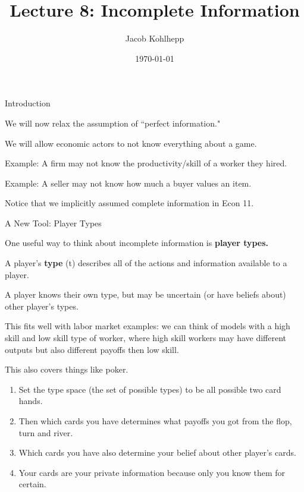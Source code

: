 \documentclass[aspectratio=169]{beamer}
\title[Incomplete]{Lecture 8: Incomplete Information} %
\author{Jacob Kohlhepp} %
\institute[UCLA] %
{
Econ 101 \\ %
\medskip
}
\date{\today} %
\newenvironment{wideitemize}{\itemize\addtolength{\itemsep}{10pt}}{\enditemize}
\begin{document}
\begin{frame}
\titlepage %
\end{frame}

\begin{frame}{Introduction}
\begin{wideitemize}
    \item We will now relax the assumption of ``perfect information."
    \item We will allow economic actors to not know everything about a game.
    \item Example: A firm may not know the productivity/skill of a worker they hired.
    \item Example: A seller may not know how much a buyer values an item.
    \item Notice that we implicitly assumed complete information in Econ 11.

\end{wideitemize}
\end{frame}

\begin{frame}{A New Tool: Player Types}

\begin{wideitemize}
    \item One useful way to think about incomplete information is \textbf{player types.}
    \begin{definition}
    A player's \textbf{type} (t) describes all of the actions and information available to a player.
    \end{definition}
    \item A player knows their own type, but may be uncertain (or have beliefs about) other player's types.
    \item This fits well with labor market examples: we can think of models with a high skill and low skill type of worker, where high skill workers may have different outputs but also different payoffs then low skill.
    \item This also covers things like poker.
    \begin{enumerate}
        \item Set the type space (the set of possible types) to be all possible two card hands.
        \item Then which cards you have determines what payoffs you got from the flop, turn and river.
        \item Which cards you have also determine your belief about other player's cards.
        \item Your cards are your private information because only you know them for certain.
    \end{enumerate}
\end{wideitemize}
    
\end{frame}
\end{document}
